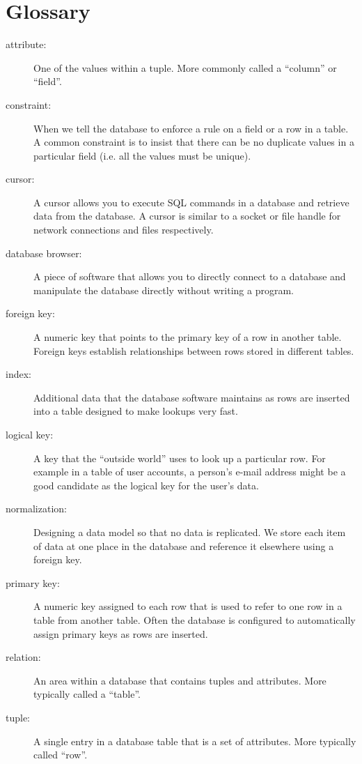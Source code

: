 \documentclass[10pt]{book}
\begin{document}
\section{Glossary}

\begin{description}

\item[attribute:] One of the values within a tuple.  More commonly
called a ``column'' or ``field''.

\item[constraint:] 
When we tell the database to enforce a rule on a field or a row
in a table.  A common constraint is to insist that there can be no
duplicate values in a particular field (i.e. all the values must be unique).

\item[cursor:] A cursor allows you to execute SQL commands in a database
and retrieve data from the database.  A cursor is similar to 
a socket or file handle for network connections and files respectively.

\item[database browser:] 
A piece of software that allows you to directly connect to a database 
and manipulate the database directly without writing a program.

\item[foreign key:] A numeric key that points to the primary key of 
a row in another table.  Foreign keys establish relationships between rows
stored in different tables.

\item[index:] Additional data that the database software maintains as rows
are inserted into a table designed to make lookups very fast.

\item[logical key:] A key that the ``outside world'' uses to look up a particular
row.  For example in a table of user accounts, a person's e-mail address
might be a good candidate as the logical key for the user's data. 

\item[normalization:] Designing a data model so that no data
is replicated.  We store each item of data at one place in the database
and reference it elsewhere using a foreign key.

\item[primary key:] A numeric key assigned to each row that is used to 
refer to one row in a table from another table.  Often the database
is configured to automatically assign primary keys as rows are inserted.

\item[relation:] An area within a database that contains tuples and 
attributes.  More typically called a ``table''.

\item[tuple:] A single entry in a database table that is a set 
of attributes.  More typically called ``row''.

\end{description}
\end{document}
